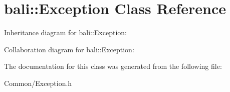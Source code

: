 \hypertarget{classbali_1_1_exception}{\section{bali\-:\-:Exception Class Reference}
\label{classbali_1_1_exception}
}


Inheritance diagram for bali\-:\-:Exception\-:


Collaboration diagram for bali\-:\-:Exception\-:


The documentation for this class was generated from the following file\-:\begin{DoxyCompactItemize}
\item 
Common/Exception.\-h\end{DoxyCompactItemize}
